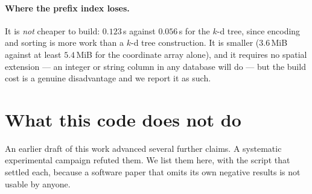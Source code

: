 \documentclass[11pt,a4paper]{article}
\theoremstyle{plain}
\theoremstyle{definition}
\theoremstyle{remark}
\begin{document}
\paragraph{Where the prefix index loses.} It is \emph{not} cheaper to
build: $0.123$\,s against $0.056$\,s for the $k$-d tree, since encoding and
sorting is more work than a $k$-d tree construction. It is smaller
($3.6$\,MiB against at least $5.4$\,MiB for the coordinate array alone),
and it requires no spatial extension --- an integer or string column in any
database will do --- but the build cost is a genuine disadvantage and we
report it as such.

\section{What this code does not do}\label{sec:not}

An earlier draft of this work advanced several further claims. A systematic
experimental campaign refuted them. We list them here, with the script that
settled each, because a software paper that omits its own negative results
is not usable by anyone.
\end{document}
